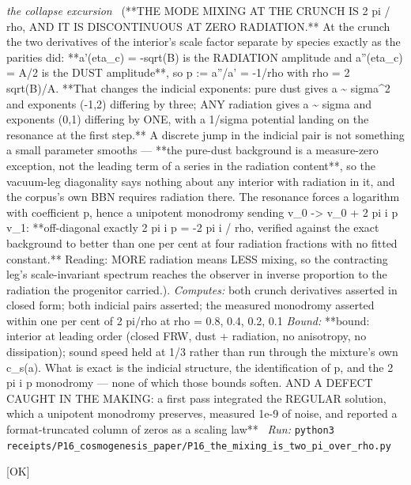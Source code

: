 \begin{description}
\textit{the collapse excursion} \ (**THE MODE MIXING AT THE CRUNCH IS 2 pi / rho, AND IT IS DISCONTINUOUS AT ZERO RADIATION.** At the crunch the two derivatives of the interior's scale factor separate by species exactly as the parities did: **a'(eta\_c) = -sqrt(B) is the RADIATION amplitude and a''(eta\_c) = A/2 is the DUST amplitude**, so p := a''/a' = -1/rho with rho = 2 sqrt(B)/A. **That changes the indicial exponents: pure dust gives a \textasciitilde{} sigma\textasciicircum{}2 and exponents (-1,2) differing by three; ANY radiation gives a \textasciitilde{} sigma and exponents (0,1) differing by ONE, with a 1/sigma potential landing on the resonance at the first step.** A discrete jump in the indicial pair is not something a small parameter smooths --- **the pure-dust background is a measure-zero exception, not the leading term of a series in the radiation content**, so the vacuum-leg diagonality says nothing about any interior with radiation in it, and the corpus's own BBN requires radiation there. The resonance forces a logarithm with coefficient p, hence a unipotent monodromy sending v\_0 -> v\_0 + 2 pi i p v\_1: **off-diagonal exactly 2 pi i p = -2 pi i / rho, verified against the exact background to better than one per cent at four radiation fractions with no fitted constant.** Reading: MORE radiation means LESS mixing, so the contracting leg's scale-invariant spectrum reaches the observer in inverse proportion to the radiation the progenitor carried.). 
\emph{Computes:} both crunch derivatives asserted in closed form; both indicial pairs asserted; the measured monodromy asserted within one per cent of 2 pi/rho at rho = 0.8, 0.4, 0.2, 0.1
 \emph{Bound:} **bound: interior at leading order (closed FRW, dust + radiation, no anisotropy, no dissipation); sound speed held at 1/3 rather than run through the mixture's own c\_s(a). What is exact is the indicial structure, the identification of p, and the 2 pi i p monodromy --- none of which those bounds soften. AND A DEFECT CAUGHT IN THE MAKING: a first pass integrated the REGULAR solution, which a unipotent monodromy preserves, measured 1e-9 of noise, and reported a format-truncated column of zeros as a scaling law**
\ \emph{Run:} \texttt{python3 receipts/P16\_cosmogenesis\_paper/P16\_the\_mixing\_is\_two\_pi\_over\_rho.py}
\item[\rcptlabel{P16_what_the_sky_permits}{P16R17}\textbf{P16R17}\quad\texttt{P16\_what\_the\_sky\_permits}]\hfill\textsf{[OK]}\\

\end{description}

